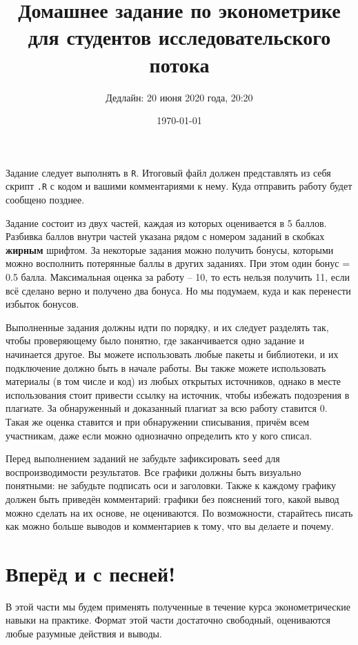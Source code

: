\documentclass[10pt, a4paper]{extarticle}
\title{Домашнее задание по эконометрике для студентов исследовательского потока\vspace{-0.5em}}
\author{Дедлайн: 20 июня 2020 года, 20:20}
\date{\today}
\newcommand{\code}[1]{{\tt #1}}
\begin{document}
\maketitle

\begin{shaded}
Задание следует выполнять в \code{R}. Итоговый файл должен представлять из себя скрипт \code{.R} с кодом и вашими комментариями к нему. Куда отправить работу будет сообщено позднее.

Задание состоит из двух частей, каждая из которых оценивается в 5 баллов. Разбивка баллов внутри частей указана рядом с номером заданий в скобках \textbf{жирным} шрифтом. За некоторые задания можно получить бонусы, которыми можно восполнить потерянные баллы в других заданиях. При этом один бонус = 0.5 балла. Максимальная оценка за работу -- 10, то есть нельзя получить 11, если всё сделано верно и получено два бонуса. Но мы подумаем, куда и как перенести избыток бонусов.

Выполненные задания должны идти по порядку, и их следует разделять так, чтобы проверяющему было понятно, где заканчивается одно задание и начинается другое. Вы можете использовать любые пакеты и библиотеки, и их подключение должно быть в начале работы. Вы также можете использовать материалы (в том числе и код) из любых открытых источников, однако в месте использования стоит привести ссылку на источник, чтобы избежать подозрения в плагиате. За обнаруженный и доказанный плагиат за всю работу ставится 0. Такая же оценка ставится и при обнаружении списывания, причём всем участникам, даже если можно однозначно определить кто у кого списал. 

Перед выполнением заданий не забудьте зафиксировать \code{seed} для воспроизводимости результатов. Все графики должны быть визуально понятными: не забудьте подписать оси и заголовки. Также к каждому графику должен быть приведён комментарий: графики без пояснений того, какой вывод можно сделать на их основе, не оцениваются. По возможности, старайтесь писать как можно больше выводов и комментариев к тому, что вы делаете и почему.
\end{shaded}

\section{Вперёд и с песней!}
В этой части мы будем применять полученные в течение курса эконометрические навыки на практике. Формат этой части достаточно свободный, оцениваются любые разумные действия и выводы. 
\end{document}
